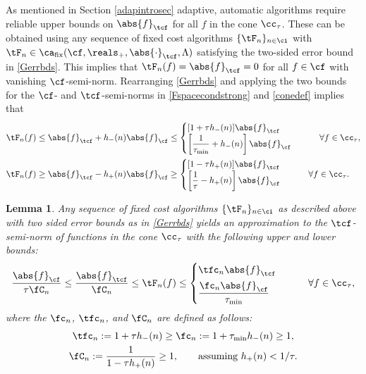 \documentclass[]{elsarticle}
\DeclareMathOperator{\fix}{fix}
\newtheorem{lem}{Lemma}
\theoremstyle{definition}
\theoremstyle{remark}
\newcommand{\Fnorm}[1]{\abs{#1}_{\cf}}
\newcommand{\Ftnorm}[1]{\abs{#1}_{\tcf}}
\begin{document}
As mentioned in Section \ref{adapintrosec} adaptive, automatic algorithms require reliable upper bounds on $\Ftnorm{f}$ for all $f$ in the cone $\cc_{\tau}$. These can be obtained using any sequence of fixed cost algorithms $\{\tF_n\}_{n \in \ci}$ with $\tF_n \in \ca_{\fix}(\cf,\reals_+,\Ftnorm{\cdot},\Lambda)$ satisfying the two-sided error bound in \eqref{Gerrbds}.  This implies that $\tF_n(f)=\Ftnorm{f}=0$ for all $f \in \cf$ with vanishing $\cf$-semi-norm.  Rearranging \eqref{Gerrbds} and applying the two bounds for the $\cf$- and $\tcf$-semi-norms in \eqref{Fspacecondstrong} and \eqref{conedef} implies that 
\begin{align*} 
\tF_n(f) &\le \Ftnorm{f} + h_{-}(n)\Fnorm{f} \le \begin{cases} [1+ \tau h_{-}(n)]\Ftnorm{f} \\
\displaystyle \left [\frac{1}{\tau_{\min}}+h_{-}(n) \right]\Fnorm{f} 
\end{cases} \qquad \forall f \in \cc_{\tau},\\
\tF_n(f) &\ge \Ftnorm{f} - h_{+}(n)\Fnorm{f} \ge \begin{cases} [1 - \tau h_{+}(n)]\Ftnorm{f} \\
\displaystyle \left [\frac{1}{\tau}-h_{+}(n) \right]\Fnorm{f} 
\end{cases} \qquad \forall f \in \cc_{\tau}.
\end{align*}

\begin{lem} \label{Gnormlem} Any sequence of fixed cost algorithms  $\{\tF_n\}_{n \in \ci}$ as described above with two sided error bounds as in \eqref{Gerrbds} yields an approximation to the $\tcf$-semi-norm of functions in the cone $\cc_{\tau}$ with the following upper and lower bounds:
\begin{equation} \label{twosidedGineq}
 \frac{\Fnorm{f}}{\tau \fC_n}  \le \frac{\Ftnorm{f}}{\fC_n}  \le \tF_n(f) \le  \begin{cases} \tfc_n \Ftnorm{f} \\[1ex]
\displaystyle \frac{\fc_n \Fnorm{f} }{\tau_{\min}}
\end{cases} \qquad \forall f \in \cc_{\tau},
\end{equation}
where the $\fc_n$, $\tfc_n$, and $\fC_n$ are defined as follows:
\begin{gather} \label{normdeflate}
\tfc_n :=1 + \tau h_{ -}(n)  \ge \fc_n :=1 + \tau_{\min} h_{ -}(n)  \ge 1, \\
\label{norminflate}
\fC_n :=\frac{1}{1 - \tau h_{ +}(n)} \ge 1, \qquad \text{assuming } h_{ +}(n) < 1/\tau.
\end{gather}
\end{lem}
\end{document}
